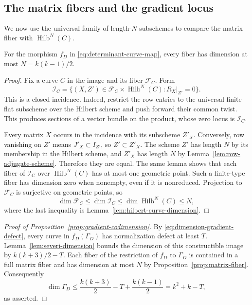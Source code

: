 \subsection{The matrix fibers and the gradient locus}

We now use the universal family of length-$N$ subschemes to compare the
matrix fiber with $\operatorname{Hilb}^N(C)$.

\begin{proposition}\label{prop:matrix-fiber}
For the morphism $f_D$ in \eqref{eq:determinant-curve-map}, every fiber
has dimension at most $N=k(k-1)/2$.
\end{proposition}

\begin{proof}
Fix a curve $C$ in the image and its fiber $\mathcal F_C$.  Form
\[
 \mathcal I_C=
 \{(X,Z')\in\mathcal F_C\times\operatorname{Hilb}^N(C):
 R_X|_{Z'}=0\}.
\]
This is a closed incidence.  Indeed, restrict the row entries to the
universal finite flat subscheme over the Hilbert scheme and push forward
their common twist.  This produces sections of a vector bundle on the
product, whose zero locus is $\mathcal I_C$.

Every matrix $X$ occurs in the incidence with its subscheme $Z'_X$.
Conversely, row vanishing on $Z'$ means $J'_X\subset I_{Z'}$, so
$Z'\subset Z'_X$.  The scheme $Z'$ has length $N$ by its membership
in the Hilbert scheme, and $Z'_X$ has length $N$ by
Lemma~\ref{lem:row-adjugate-scheme}.  Therefore they are equal.
The same lemma shows that each fiber of $\mathcal I_C$ over
$\operatorname{Hilb}^N(C)$ has at most one geometric point.  Such a
finite-type fiber has dimension zero when nonempty, even if it is
nonreduced.  Projection to $\mathcal F_C$ is surjective on geometric
points, so
\[
 \dim\mathcal F_C
 \leq\dim\mathcal I_C
 \leq\dim\operatorname{Hilb}^N(C)
 \leq N,
\]
where the last inequality is Lemma~\ref{lem:hilbert-curve-dimension}.
\end{proof}

\begin{proof}[Proof of Proposition~\ref{prop:gradient-codimension}]
By \eqref{eq:dimension-gradient-defect}, every curve in
$f_D(\Gamma_D)$ has normalization defect at least $T$.
Lemma~\ref{lem:severi-dimension} bounds the dimension of this
constructible image by $k(k+3)/2-T$.  Each fiber of the restriction
of $f_D$ to $\Gamma_D$ is contained in a full matrix fiber and has
dimension at most $N$ by Proposition~\ref{prop:matrix-fiber}.
Consequently
\[
 \dim\Gamma_D
 \leq\frac{k(k+3)}2-T+\frac{k(k-1)}2
 =k^2+k-T,
\]
as asserted.
\end{proof}
